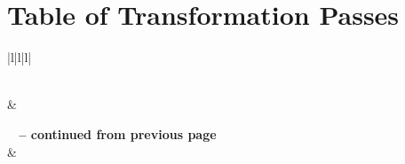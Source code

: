
\chapter[Table of Transformation Passes]{Table of Transformation Passes}


\begin{longtable}{|l|l|l|}
  \caption{LLVM Transformation Passes} \label{tab:transformation} \\

  \hline {} &  \\ \hline
  \endfirsthead

  {{\bfseries \tablename\ \thetable{} -- continued from previous page}} \\
  \hline {} &  \\ \hline
  \endhead

  \hline {} \\ \hline
  \endfoot

  \hline \hline

  \endlastfoot


\end{longtable}
